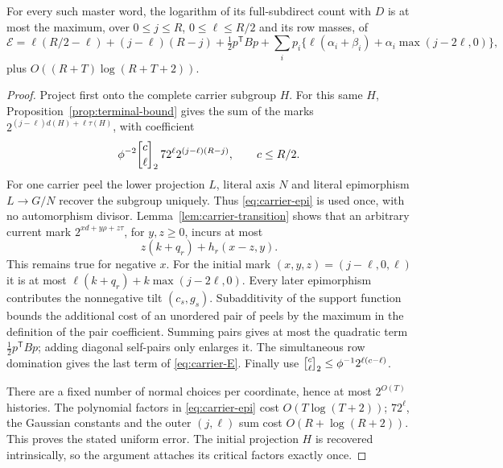 \begin{lemma}\label{lem:carrier-recurrence}
For every such master word, the logarithm of its full-subdirect count
with $D$ is at most the maximum, over $0\leq j\leq R$,
$0\leq\ell\leq R/2$ and its row masses, of
\begin{equation}\label{eq:carrier-E}
 \mathcal E=\ell(R/2-\ell)+(j-\ell)(R-j)
   +\tfrac12p^{\mathsf T}Bp
   +\sum_i p_i\{\ell(\alpha_i+\beta_i)
                       +\alpha_i\max(j-2\ell,0)\},
\end{equation}
plus $O((R+T)\log(R+T+2))$.
\end{lemma}
\begin{proof}
Project first onto the complete carrier subgroup $H$. For this same
$H$, Proposition~\ref{prop:terminal-bound} gives the sum of the marks
$2^{(j-\ell)d(H)+\ell\tau(H)}$, with coefficient
\[
 \phi^{-2}\gauss c\ell2\,72^\ell2^{(j-\ell)(R-j)},
 \qquad c\leq R/2.
\]
For one carrier peel the lower projection $L$, literal axis $N$ and
literal epimorphism $L\to G/N$ recover the subgroup uniquely. Thus
\eqref{eq:carrier-epi} is used once, with no automorphism divisor.
Lemma~\ref{lem:carrier-transition} shows that an arbitrary current
mark $2^{x d+y\rho+z\tau}$, for $y,z\geq0$, incurs at most
\[
 z(k+q_r)+h_r(x-z,y).
\]
This remains true for negative $x$. For the initial mark
$(x,y,z)=(j-\ell,0,\ell)$ it is at most
$\ell(k+q_r)+k\max(j-2\ell,0)$.
Every later epimorphism contributes the nonnegative tilt $(c_s,g_s)$.
Subadditivity of the support function bounds the additional cost of
an unordered pair of peels by the maximum in the definition of the
pair coefficient. Summing pairs gives at most the quadratic term
$\tfrac12p^{\mathsf T}Bp$; adding diagonal self-pairs only enlarges it.
The simultaneous row domination gives the last term of
\eqref{eq:carrier-E}. Finally use
$\gauss c\ell2\leq\phi^{-1}2^{\ell(c-\ell)}$.

There are a fixed number of normal choices per coordinate, hence at
most $2^{O(T)}$ histories. The polynomial factors in
\eqref{eq:carrier-epi} cost $O(T\log(T+2))$; $72^\ell$, the Gaussian
constants and the outer $(j,\ell)$ sum cost $O(R+\log(R+2))$.
This proves the stated uniform error. The initial projection $H$ is
recovered intrinsically, so the argument attaches its critical factors
exactly once.
\end{proof}

